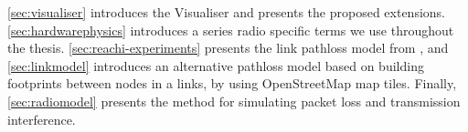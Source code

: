 \autoref{sec:visualiser} introduces the Visualiser and presents the proposed extensions.
\autoref{sec:hardwarephysics} introduces a series radio specific terms we use throughout the thesis.
\autoref{sec:reachi-experiments} presents the link \gls{pathloss} model from \cite{paper:linkmodel}, and
\autoref{sec:linkmodel} introduces an alternative \gls{pathloss} model based on building footprints between
nodes in a links, by using OpenStreetMap map tiles. Finally, \autoref{sec:radiomodel} presents the method for
simulating packet loss and transmission interference.






